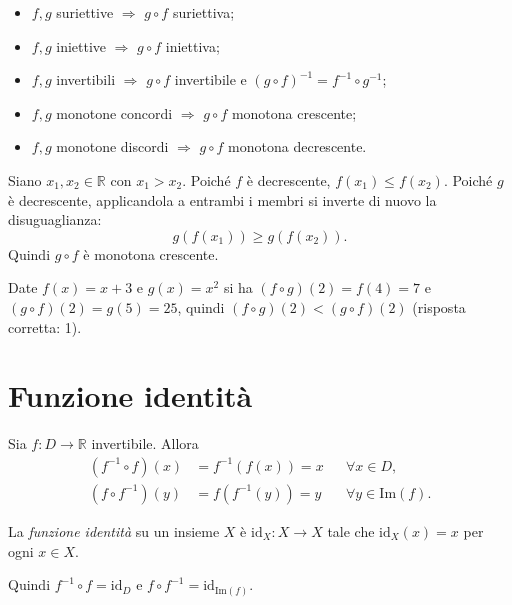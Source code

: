 \documentclass[11pt,a4paper]{article}
\begin{document}
\begin{proprieta}
\leavevmode
\begin{itemize}
    \item $f, g$ suriettive $\Rightarrow$ $g \circ f$ suriettiva;
    \item $f, g$ iniettive $\Rightarrow$ $g \circ f$ iniettiva;
    \item $f, g$ invertibili $\Rightarrow$ $g \circ f$ invertibile e $(g \circ f)^{-1} = f^{-1} \circ g^{-1}$;
    \item $f, g$ monotone concordi $\Rightarrow$ $g \circ f$ monotona crescente;
    \item $f, g$ monotone discordi $\Rightarrow$ $g \circ f$ monotona decrescente.
\end{itemize}
\end{proprieta}

\begin{esempio}
Siano $x_1, x_2 \in \mathbb{R}$ con $x_1 > x_2$. Poiché $f$ è decrescente, $f(x_1) \leq f(x_2)$. Poiché $g$ è decrescente, applicandola a entrambi i membri si inverte di nuovo la disuguaglianza:
\[
g(f(x_1)) \geq g(f(x_2)).
\]
Quindi $g \circ f$ è monotona crescente.
\end{esempio}

\begin{esempio}[Test]
Date $f(x) = x + 3$ e $g(x) = x^2$ si ha $(f \circ g)(2) = f(4) = 7$ e $(g \circ f)(2) = g(5) = 25$, quindi $(f \circ g)(2) < (g \circ f)(2)$ (risposta corretta: 1).
\end{esempio}

\section{Funzione identità}

Sia $f : D \to \mathbb{R}$ invertibile. Allora
\begin{align*}
(f^{-1} \circ f)(x) &= f^{-1}(f(x)) = x && \forall x \in D, \\
(f \circ f^{-1})(y) &= f(f^{-1}(y)) = y && \forall y \in \mathrm{Im}(f).
\end{align*}

\begin{definizione}
La \emph{funzione identità} su un insieme $X$ è $\mathrm{id}_X : X \to X$ tale che $\mathrm{id}_X(x) = x$ per ogni $x \in X$.
\end{definizione}

Quindi $f^{-1} \circ f = \mathrm{id}_D$ e $f \circ f^{-1} = \mathrm{id}_{\mathrm{Im}(f)}$.
\end{document}
